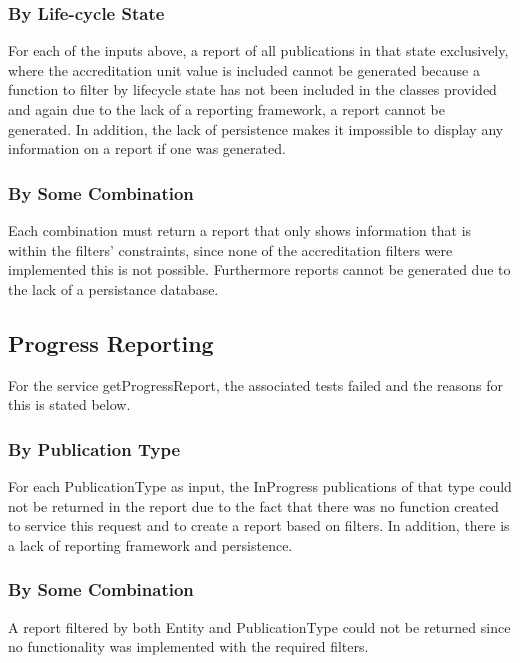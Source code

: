 \subsubsection{By Life-cycle State}
For each of the inputs above, a report of all publications in that state exclusively, where the accreditation unit value is included cannot be generated because a function to filter by lifecycle state has not been included in the classes provided and again due to the lack of a reporting framework, a report cannot be generated. In addition, the lack of persistence makes it impossible to display any information on a report if one was generated. 

\subsubsection{By Some Combination}
Each combination must return a report that only shows information that is within the filters' constraints, since none of the accreditation filters were implemented this is not possible. Furthermore reports cannot be generated due to the lack of a persistance database.
 
\subsection{Progress Reporting} 
For the service getProgressReport, the associated tests failed and the reasons for this is stated below. 

\subsubsection{By Publication Type}
For each PublicationType as input, the InProgress publications of that type could not be returned in the report due to the fact that there was no function created to service this request and to create a report based on filters. In addition, there is a lack of reporting framework and persistence.

\subsubsection{By Some Combination }
A report filtered by both Entity and PublicationType could not be returned since no functionality was implemented with the required filters.

